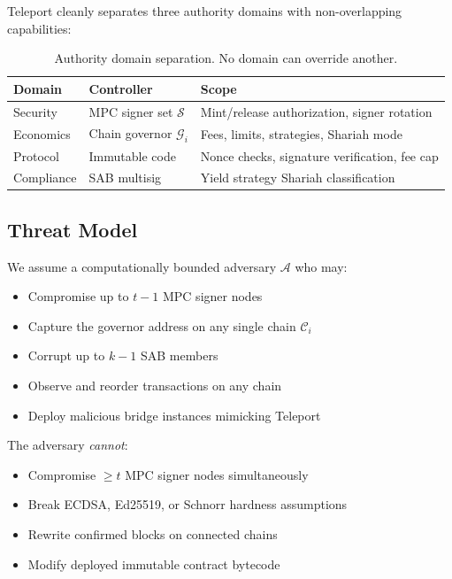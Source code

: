 \documentclass[11pt,twocolumn]{article}
\theoremstyle{definition}
\newcommand{\Gov}{\mathcal{G}}
\newcommand{\Signer}{\mathcal{S}}
\newcommand{\Chain}{\mathcal{C}}
\begin{document}
Teleport cleanly separates three authority domains with non-overlapping capabilities:

\begin{table}[h]
\centering
\small
\begin{tabular}{@{}p{1.5cm}p{2.5cm}p{2.8cm}@{}}
\toprule
\textbf{Domain} & \textbf{Controller} & \textbf{Scope} \\
\midrule
Security & MPC signer set $\Signer$ & Mint/release authorization, signer rotation \\
\addlinespace
Economics & Chain governor $\Gov_i$ & Fees, limits, strategies, Shariah mode \\
\addlinespace
Protocol & Immutable code & Nonce checks, signature verification, fee cap \\
\addlinespace
Compliance & SAB multisig & Yield strategy Shariah classification \\
\bottomrule
\end{tabular}
\caption{Authority domain separation. No domain can override another.}
\label{tab:separation}
\end{table}

\subsection{Threat Model}

We assume a computationally bounded adversary $\mathcal{A}$ who may:
\begin{itemize}[nosep]
  \item Compromise up to $t - 1$ MPC signer nodes
  \item Capture the governor address on any single chain $\Chain_i$
  \item Corrupt up to $k - 1$ SAB members
  \item Observe and reorder transactions on any chain
  \item Deploy malicious bridge instances mimicking Teleport
\end{itemize}

The adversary \emph{cannot}:
\begin{itemize}[nosep]
  \item Compromise $\geq t$ MPC signer nodes simultaneously
  \item Break ECDSA, Ed25519, or Schnorr hardness assumptions
  \item Rewrite confirmed blocks on connected chains
  \item Modify deployed immutable contract bytecode
\end{itemize}
\end{document}
